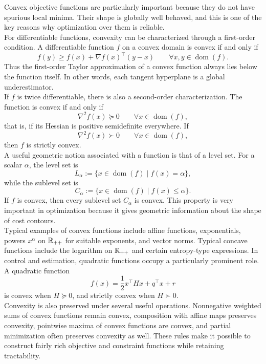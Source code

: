 Convex objective functions are particularly important because they do not have spurious local minima. Their shape is globally well behaved, and this is one of the key reasons why optimization over them is reliable.\\

For differentiable functions, convexity can be characterized through a first-order condition. A differentiable function \(f\) on a convex domain is convex if and only if
\[
f(y)\ge f(x) + \nabla f(x)^\top (y-x)
\qquad
\forall x,y\in\operatorname{dom}(f).
\]
Thus the first-order Taylor approximation of a convex function always lies below the function itself. In other words, each tangent hyperplane is a global underestimator.\\

If \(f\) is twice differentiable, there is also a second-order characterization. The function is convex if and only if
\[
\nabla^2 f(x)\succeq 0
\qquad
\forall x\in\operatorname{dom}(f),
\]
that is, if its Hessian is positive semidefinite everywhere. If
\[
\nabla^2 f(x)\succ 0
\qquad
\forall x\in\operatorname{dom}(f),
\]
then \(f\) is strictly convex.\\

A useful geometric notion associated with a function is that of a level set. For a scalar \(\alpha\), the level set is
\[
L_\alpha := \{x\in\operatorname{dom}(f)\mid f(x)=\alpha\},
\]
while the sublevel set is
\[
C_\alpha := \{x\in\operatorname{dom}(f)\mid f(x)\le \alpha\}.
\]
If \(f\) is convex, then every sublevel set \(C_\alpha\) is convex. This property is very important in optimization because it gives geometric information about the shape of cost contours.\\

Typical examples of convex functions include affine functions, exponentials, powers \(x^\alpha\) on \(\mathbb{R}_{++}\) for suitable exponents, and vector norms. Typical concave functions include the logarithm on \(\mathbb{R}_{++}\) and certain entropy-type expressions. In control and estimation, quadratic functions occupy a particularly prominent role.\\
 A quadratic function
\[
f(x)=\frac12 x^\top Hx + q^\top x + r
\]
is convex when \(H\succeq 0\), and strictly convex when \(H\succ 0\).\\

Convexity is also preserved under several useful operations. Nonnegative weighted sums of convex functions remain convex, composition with affine maps preserves convexity, pointwise maxima of convex functions are convex, and partial minimization often preserves convexity as well. These rules make it possible to construct fairly rich objective and constraint functions while retaining tractability.

